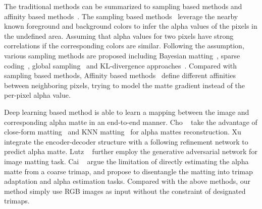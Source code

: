 \documentclass[10pt,twocolumn,letterpaper]{article}
\begin{document}
The traditional methods can be summarized to sampling based methods and affinity based methods~\cite{wang2008image}. The sampling based methods~\cite{chuang2001bayesian,feng2016cluster,gastal2010shared,he2011global,johnson2016sparse,karacan2015image,ruzon2000alpha} leverage the nearby known foreground and background colors to infer the alpha values of the pixels in the undefined area. Assuming that alpha values for two pixels have strong correlations if the corresponding colors are similar. Following the assumption, various sampling methods are proposed including Bayesian matting~\cite{chuang2001bayesian}, sparse coding~\cite{feng2016cluster,johnson2016sparse}, global sampling~\cite{he2011global} and KL-divergence approaches~\cite{karacan2015image}. Compared with sampling based methods, Affinity based methods~\cite{aksoy2018semantic,aksoy2017designing,bai2007geodesic,chen2013knn,grady2005random,levin2007closed,levin2008spectral,sun2004poisson} define different affinities between neighboring pixels, trying to model the matte gradient instead of the per-pixel alpha value.


Deep learning based method is able to learn a mapping between the image and corresponding alpha matte in an end-to-end manner. Cho \etal~\cite{cho2016natural} take the advantage of close-form matting~\cite{levin2007closed} and KNN matting~\cite{chen2013knn} for alpha mattes reconstruction. Xu \etal~\cite{xu2017deep} integrate the encoder-decoder structure with a following refinement network to predict alpha matte. Lutz \etal~\cite{lutz2018alphagan} further employ the generative adversarial network for image matting task. Cai \etal~\cite{Cai_2019_ICCV} argue the limitation of directly estimating the alpha matte from a coarse trimap, and propose to disentangle the matting into trimap adaptation and alpha estimation tasks. Compared with the above methods, our method simply use RGB images as input without the constraint of designated trimaps.
\end{document}
